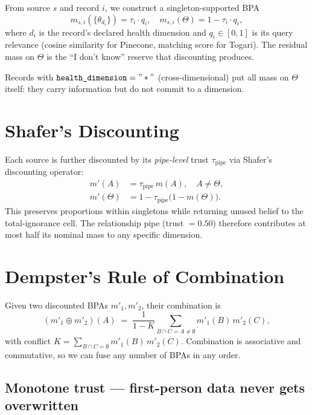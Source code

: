 \documentclass[11pt]{article}
\begin{document}
From source $s$ and record $i$, we construct a singleton-supported BPA
\begin{equation}
m_{s,i}(\{\theta_{d_i}\}) = \tau_i \cdot q_i,
\quad
m_{s,i}(\Theta) = 1 - \tau_i \cdot q_i,
\end{equation}
where $d_i$ is the record's declared health dimension and
$q_i\in[0,1]$ is its query relevance (cosine similarity for Pinecone,
matching score for Togari). The residual mass on $\Theta$ is the
``I don't know'' reserve that discounting produces.

Records with $\texttt{health\_dimension}="*"$ (cross-dimensional) put
all mass on $\Theta$ itself: they carry information but do not commit
to a dimension.

\section{Shafer's Discounting}

Each source is further discounted by its \emph{pipe-level} trust
$\tau_{\text{pipe}}$ via Shafer's discounting operator:
\begin{align}
m'(A) &= \tau_{\text{pipe}}\, m(A), \quad A \neq \Theta, \\
m'(\Theta) &= 1 - \tau_{\text{pipe}} \bigl(1 - m(\Theta)\bigr).
\end{align}
This preserves proportions within singletons while returning unused
belief to the total-ignorance cell. The relationship pipe (trust
$=0.50$) therefore contributes at most half its nominal mass to any
specific dimension.

\section{Dempster's Rule of Combination}

Given two discounted BPAs $m'_1, m'_2$, their combination is
\begin{equation}
(m'_1\oplus m'_2)(A)
 \;=\; \frac{1}{1-K}\sum_{B\cap C = A \neq \emptyset} m'_1(B)\, m'_2(C),
\end{equation}
with conflict
$K = \sum_{B\cap C=\emptyset} m'_1(B)\, m'_2(C)$.
Combination is associative and commutative, so we can fuse any number
of BPAs in any order.

\subsection{Monotone trust --- first-person data never gets overwritten}
\end{document}
